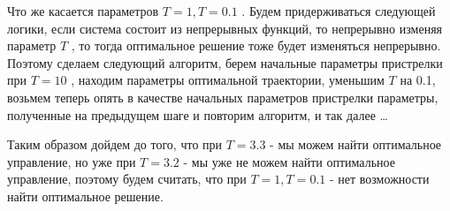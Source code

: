 \documentclass[a4paper,12pt]{article}
\begin{document}
Что же касается параметров $T=1,T=0.1$ . Будем придерживаться следующей логики, если система состоит из непрерывных функций, то непрерывно изменяя параметр $T$ , то тогда оптимальное решение тоже будет изменяться непрерывно. Поэтому сделаем следующий алгоритм, берем начальные параметры пристрелки при $T=10$ , находим параметры оптимальной траектории, уменьшим $T$ на 0.1, возьмем теперь опять в качестве начальных параметров пристрелки параметры, полученные на предыдущем шаге и повторим алгоритм, и так далее \dots

Таким образом дойдем до того, что при $T=3.3$ - мы можем найти оптимальное управление, но уже при $T=3.2$ - мы уже не можем найти оптимальное управление, поэтому будем считать, что при $T=1, T=0.1$ - нет возможности найти оптимальное решение.
\end{document}
